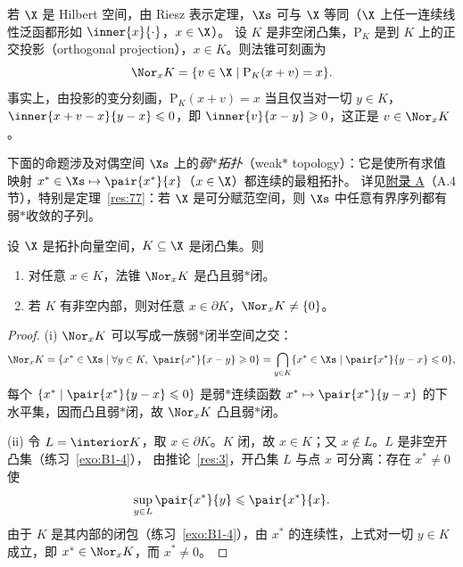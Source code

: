\begin{example}
\label{exa:4}
若 $\X$ 是 Hilbert 空间，由 Riesz 表示定理，$\Xs$ 可与 $\X$ 等同（$\X$ 上任一连续线性泛函都形如 $\inner{x}{\cdot}$，$x\in\X$）。
设 $K$ 是非空闭凸集，$\mathrm P_K$ 是到 $K$ 上的正交投影（orthogonal projection），$x\in K$。则法锥可刻画为
\[
  \Nor_xK=\{v\in\X\mid\mathrm P_K(x+v)=x\}.
\]
事实上，由投影的变分刻画，$\mathrm P_K(x+v)=x$ 当且仅当对一切 $y\in K$，$\inner{x+v-x}{y-x}\leqslant0$，即 $\inner{v}{x-y}\geqslant0$，这正是 $v\in\Nor_xK$。
\end{example}

下面的命题涉及对偶空间 $\Xs$ 上的\emph{弱$*$拓扑}（weak$*$ topology）：它是使所有求值映射 $x^*\in\Xs\mapsto\pair{x^*}{x}$（$x\in\X$）都连续的最粗拓扑。
详见\hyperref[ch:appA]{附录 A}（A.4 节），特别是定理~\ref{res:77}：若 $\X$ 是可分赋范空间，则 $\Xs$ 中任意有界序列都有弱$*$收敛的子列。

\begin{proposition}
\label{res:14}
设 $\X$ 是拓扑向量空间，$K\subseteq\X$ 是闭凸集。则
\begin{enumerate}[label=(\roman*)]
  \item 对任意 $x\in K$，法锥 $\Nor_xK$ 是凸且弱$*$闭。
  \item 若 $K$ 有非空内部，则对任意 $x\in\partial K$，$\Nor_xK\neq\{0\}$。
\end{enumerate}
\end{proposition}

\begin{proof}
(i) $\Nor_xK$ 可以写成一族弱$*$闭半空间之交：
\[
  \Nor_xK=\{x^*\in\Xs\mid\forall y\in K,\ \pair{x^*}{x-y}\geqslant0\}=\bigcap_{y\in K}\{x^*\in\Xs\mid\pair{x^*}{y-x}\leqslant0\},
\]
每个 $\{x^*\mid\pair{x^*}{y-x}\leqslant0\}$ 是弱$*$连续函数 $x^*\mapsto\pair{x^*}{y-x}$ 的下水平集，因而凸且弱$*$闭，故 $\Nor_xK$ 凸且弱$*$闭。

(ii) 令 $L=\interior K$，取 $x\in\partial K$。$K$ 闭，故 $x\in K$；又 $x\notin L$。$L$ 是非空开凸集（练习~\ref{exo:B1-4}），
由推论~\ref{res:3}，开凸集 $L$ 与点 $x$ 可分离：存在 $x^*\neq0$ 使
\[
  \sup_{y\in L}\pair{x^*}{y}\leqslant\pair{x^*}{x}.
\]
由于 $K$ 是其内部的闭包（练习~\ref{exo:B1-4}），由 $x^*$ 的连续性，上式对一切 $y\in K$ 成立，即 $x^*\in\Nor_xK$，而 $x^*\neq0$。
\end{proof}

